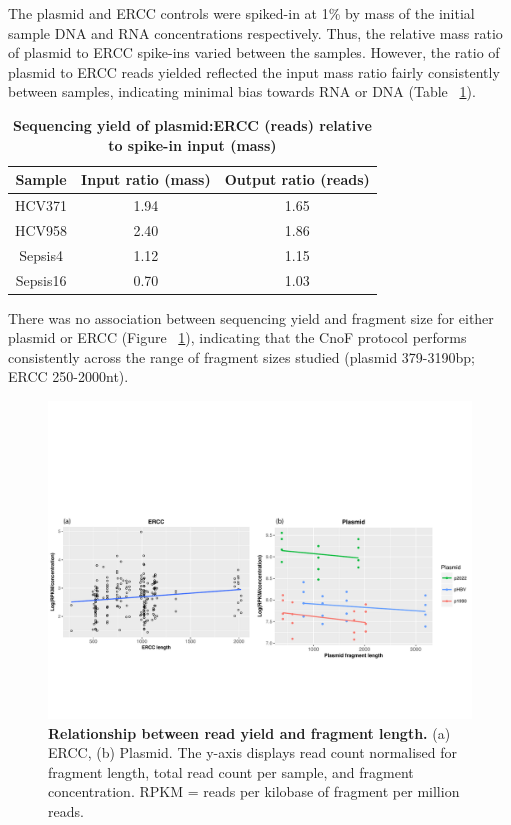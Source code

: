 The plasmid and ERCC controls were spiked-in at 1\% by mass of the initial sample DNA and RNA concentrations respectively. Thus, the relative mass ratio of plasmid to ERCC spike-ins varied between the samples. However, the ratio of plasmid to ERCC reads yielded reflected the input mass ratio fairly consistently between samples, indicating minimal bias towards RNA or DNA (Table ~\ref{tab:ratios}).

\begin{table}[]
\begin{tabular}{|c|c|c|}
\hline
Sample   & Input ratio (mass) & Output ratio (reads) \\ \hline
HCV371   & 1.94               & 1.65                 \\ \hline
HCV958   & 2.40               & 1.86                 \\ \hline
Sepsis4  & 1.12               & 1.15                 \\ \hline
Sepsis16 & 0.70               & 1.03                 \\ \hline
\end{tabular}
\caption[Combined no fragmentation evaluation: plasmid to ERCC ratios]{\textbf{Sequencing yield of plasmid:ERCC (reads) relative to spike-in input (mass)}}
\label{tab:ratios}
\end{table}


There was no association between sequencing yield and fragment size for either plasmid or ERCC (Figure ~\ref{fig:1bcontrollength}), indicating that the CnoF protocol performs consistently across the range of fragment sizes studied (plasmid 379-3190bp; ERCC 250-2000nt).

\begin{figure}[htbp]
\centering
\includegraphics[width=\textwidth, trim={0 2cm 0 8cm},clip]{./Results1/Images/1b_control_length.pdf}
\caption[Relationship between read yield and fragment length]{\textbf{Relationship between read yield and fragment length.} (a) ERCC, (b) Plasmid. The y-axis displays read count normalised for fragment length, total read count per sample, and fragment concentration. RPKM = reads per kilobase of fragment per million reads.}
\label{fig:1bcontrollength}
\end{figure}



